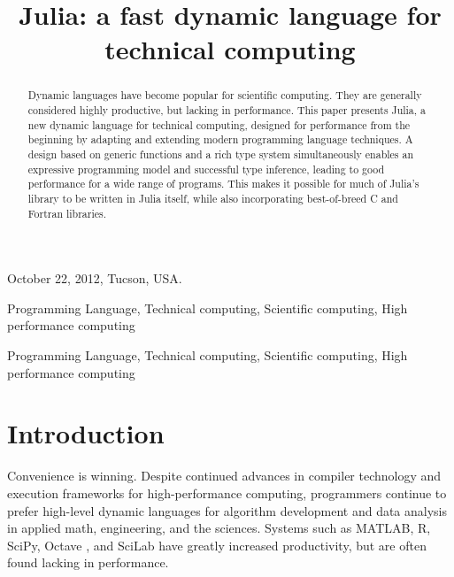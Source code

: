 \documentclass[9pt]{sigplanconf}
\newcommand{\Matlab}{MATLAB\textsuperscript{\tiny\textregistered}}
\begin{document}
               {October 22, 2012, Tucson, USA.}


\title{Julia: a fast dynamic language for technical computing}


\maketitle
\begin{abstract}
  Dynamic languages have become popular for scientific computing. They
  are generally considered highly productive, but lacking in performance.
  This paper presents Julia, a new dynamic language for technical
  computing, designed for performance from the beginning by adapting and
  extending modern programming language techniques. A design based on
  generic functions and a rich type system simultaneously enables an
  expressive programming model and successful type inference, leading to
  good performance for a wide range of programs. This makes it possible
  for much of Julia's library to be written in Julia itself, while also
  incorporating best-of-breed C and Fortran libraries.
\end{abstract}


\terms
Programming Language, Technical computing, Scientific computing, High
performance computing

\keywords
Programming Language, Technical computing, Scientific computing, High
performance computing

\section{Introduction}

Convenience is winning. Despite continued advances in compiler technology
and execution frameworks for high-performance computing, programmers
continue to prefer high-level dynamic languages for algorithm development
and data analysis in applied math, engineering, and the sciences. Systems
such as \Matlab, R\cite{Rlang}, SciPy\cite{numpy}, Octave \cite{Octave},
and SciLab \cite{scilab} have greatly increased productivity, but are
often found lacking in performance.
\end{document}
